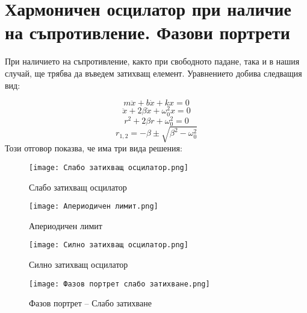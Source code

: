 \documentclass{report}
\begin{document}
\section{Хармоничен осцилатор при наличие на съпротивление. Фазови портрети}
При наличието на съпротивление, както при свободното падане, така и в нашия случай, ще трябва да въведем затихващ елемент. Уравнението добива следващия вид:

$$m\ddot x + b \dot x +kx=0$$
$$\ddot{x}+ 2\beta\dot{x}+\omega_0^2x=0$$
$$r^2+2\beta r+\omega_0^2=0$$
$$r_{1,2}=-\beta\pm \sqrt{\beta^2-\omega_0^2}$$
Този отговор показва, че има три вида решения:


\begin{figure}[t!]
    \begin{minipage}[t]{0.20\textwidth}
        \texttt{[image: Слабо затихващ осцилатор.png]}
        \caption{Слабо затихващ осцилатор}
    \end{minipage}
    \hspace{0.02\textwidth}
    \begin{minipage}[t]{0.20\textwidth}
        \texttt{[image: Апериодичен лимит.png]}
        \caption{Апериодичен лимит}
    \end{minipage}
    \hspace{0.02\textwidth}
    \begin{minipage}[t]{0.20\textwidth}
        \texttt{[image: Силно затихващ осцилатор.png]}
        \caption{Силно затихващ осцилатор}
    \end{minipage}
    \begin{minipage}[t]{0.20\textwidth}
        \texttt{[image: Фазов портрет слабо затихване.png]}
        \caption{Фазов портрет – Слабо затихване}
    \end{minipage}
\end{figure}
\end{document}
